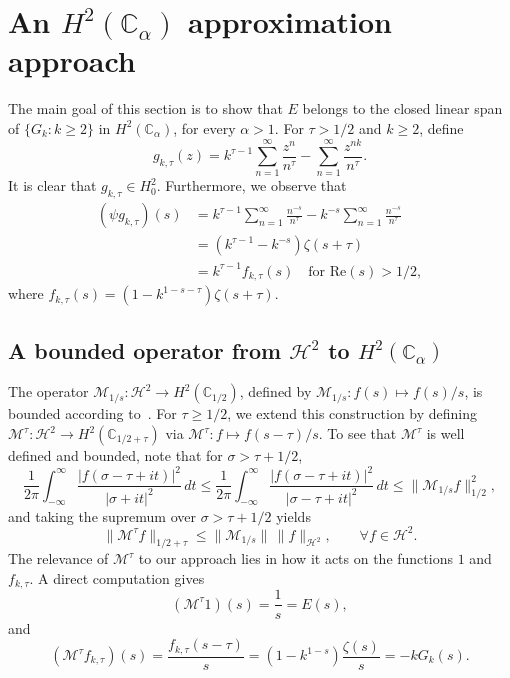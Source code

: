 \documentclass[11pt]{extarticle}
\numberwithin{equation}{section}
\theoremstyle{plain}
\theoremstyle{definition}
\begin{document}
\section{An $H^2(\mathbb{C}_\alpha)$ approximation approach}

The main goal of this section is to show that $E$ belongs to the closed linear span 
of $\{G_k : k \geq 2\}$ in $H^2(\mathbb{C}_\alpha)$, for every $\alpha > 1$. 
For $\tau > 1/2$ and $k \geq 2$, define
\[
g_{k,\tau}(z) = k^{\tau-1}\sum_{n=1}^{\infty}\frac{z^n}{n^\tau} - \sum_{n=1}^{\infty}\frac{z^{nk}}{n^\tau}.
\]
It is clear that $g_{k,\tau} \in H^2_0$. Furthermore, we observe that
\begin{align*}
(\psi g_{k,\tau})(s) &= k^{\tau-1}\sum_{n=1}^{\infty}\frac{n^{-s}}{n^\tau} - k^{-s}\sum_{n=1}^{\infty}\frac{n^{-s}}{n^\tau}\\
&= (k^{\tau-1} - k^{-s})\zeta(s+\tau)\\
&= k^{\tau-1}f_{k,\tau}(s) \quad \text{for } \mathrm{Re}(s) > 1/2,
\end{align*}
where $f_{k,\tau}(s) = (1 - k^{1-s-\tau})\zeta(s+\tau)$.

\subsection{A bounded operator from $\mathcal{H}^2$ to $H^2(\mathbb{C}_\alpha)$}

The operator $\mathcal{M}_{1/s} : \mathcal{H}^2 \to H^2(\mathbb{C}_{1/2})$, defined by 
$\mathcal{M}_{1/s} : f(s) \mapsto f(s)/s$, is bounded according to~\cite{6}. 
For $\tau \geq 1/2$, we extend this construction by defining 
$\mathcal{M}^\tau : \mathcal{H}^2 \to H^2(\mathbb{C}_{1/2+\tau})$ via $\mathcal{M}^\tau : f \longmapsto f(s - \tau)/s$. 
To see that $\mathcal{M}^\tau$ is well defined and bounded, note that for $\sigma > \tau + 1/2$,
\[
\frac{1}{2\pi}\int_{-\infty}^{\infty}\frac{|f(\sigma-\tau+it)|^2}{|\sigma+it|^2}\,dt
\leq \frac{1}{2\pi}\int_{-\infty}^{\infty}\frac{|f(\sigma-\tau+it)|^2}{|\sigma-\tau+it|^2}\,dt
\leq \|\mathcal{M}_{1/s}f\|^2_{1/2},
\]
and taking the supremum over $\sigma > \tau + 1/2$ yields
\[
\|\mathcal{M}^\tau f\|_{1/2+\tau} \leq \|\mathcal{M}_{1/s}\|\,\|f\|_{\mathcal{H}^2},
\qquad \forall f \in \mathcal{H}^2.
\]
The relevance of $\mathcal{M}^\tau$ to our approach lies in how it acts on the 
functions $1$ and $f_{k,\tau}$. A direct computation gives
\[
(\mathcal{M}^\tau 1)(s) = \frac{1}{s} = E(s),
\]
and
\[
(\mathcal{M}^\tau f_{k,\tau})(s) = \frac{f_{k,\tau}(s-\tau)}{s} 
= (1-k^{1-s})\frac{\zeta(s)}{s} = -kG_k(s).
\]
\end{document}
